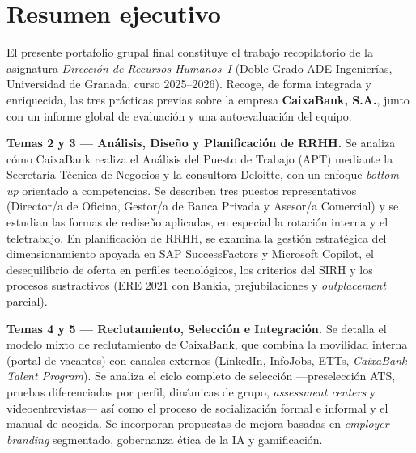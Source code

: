 
\chapter{Resumen ejecutivo}

El presente portafolio grupal final constituye el trabajo recopilatorio de la
asignatura \emph{Dirección de Recursos Humanos~I} (Doble Grado ADE-Ingenierías,
Universidad de Granada, curso 2025--2026). Recoge, de forma integrada y enriquecida,
las tres prácticas previas sobre la empresa \textbf{CaixaBank, S.A.}, junto con
un informe global de evaluación y una autoevaluación del equipo.

\medskip

\textbf{Temas 2 y 3 — Análisis, Diseño y Planificación de RRHH.}
Se analiza cómo CaixaBank realiza el Análisis del Puesto de Trabajo (APT) mediante
la Secretaría Técnica de Negocios y la consultora Deloitte, con un enfoque
\textit{bottom-up} orientado a competencias. Se describen tres puestos representativos
(Director/a de Oficina, Gestor/a de Banca Privada y Asesor/a Comercial) y se estudian
las formas de rediseño aplicadas, en especial la rotación interna y el teletrabajo.
En planificación de RRHH, se examina la gestión estratégica del dimensionamiento
apoyada en SAP SuccessFactors y Microsoft Copilot, el desequilibrio de oferta
en perfiles tecnológicos, los criterios del SIRH y los procesos sustractivos (ERE
2021 con Bankia, prejubilaciones y \textit{outplacement} parcial).

\medskip

\textbf{Temas 4 y 5 — Reclutamiento, Selección e Integración.}
Se detalla el modelo mixto de reclutamiento de CaixaBank, que combina la movilidad
interna (portal de vacantes) con canales externos (LinkedIn, InfoJobs, ETTs,
\textit{CaixaBank Talent Program}). Se analiza el ciclo completo de selección
—preselección ATS, pruebas diferenciadas por perfil, dinámicas de grupo,
\textit{assessment centers} y videoentrevistas— así como el proceso de socialización
formal e informal y el manual de acogida. Se incorporan propuestas de mejora basadas
en \textit{employer branding} segmentado, gobernanza ética de la IA y gamificación.

\medskip

